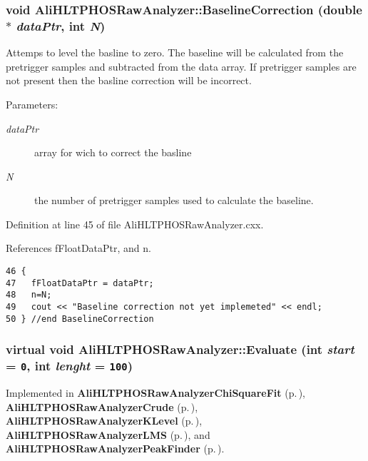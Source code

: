 \subsubsection{\setlength{\rightskip}{0pt plus 5cm}void Ali\-HLTPHOSRaw\-Analyzer::Baseline\-Correction (double $\ast$ {\em data\-Ptr}, int {\em N})}\label{classAliHLTPHOSRawAnalyzer_AliHLTPHOSRawAnalyzerPeakFindera7}


Attemps to level the basline to zero. The baseline will be calculated from the pretrigger samples and subtracted from the data array. If pretrigger samples are not present then the basline correction will be incorrect. \begin{Desc}
\item[Parameters:]
\begin{description}
\item[{\em data\-Ptr}]array for wich to correct the basline \item[{\em N}]the number of pretrigger samples used to calculate the baseline. \end{description}
\end{Desc}


Definition at line 45 of file Ali\-HLTPHOSRaw\-Analyzer.cxx.

References f\-Float\-Data\-Ptr, and n.

\footnotesize\begin{verbatim}46 {
47   fFloatDataPtr = dataPtr;  
48   n=N;
49   cout << "Baseline correction not yet implemeted" << endl;
50 } //end BaselineCorrection
\end{verbatim}\normalsize 


\subsubsection{\setlength{\rightskip}{0pt plus 5cm}virtual void Ali\-HLTPHOSRaw\-Analyzer::Evaluate (int {\em start} = {\tt 0}, int {\em lenght} = {\tt 100})\hspace{0.3cm}{\tt  [pure virtual]}}\label{classAliHLTPHOSRawAnalyzer_AliHLTPHOSRawAnalyzera14}




Implemented in {\bf Ali\-HLTPHOSRaw\-Analyzer\-Chi\-Square\-Fit} {\rm (p.\,\pageref{classAliHLTPHOSRawAnalyzerChiSquareFit_AliHLTPHOSRawAnalyzerChiSquareFita4})}, {\bf Ali\-HLTPHOSRaw\-Analyzer\-Crude} {\rm (p.\,\pageref{classAliHLTPHOSRawAnalyzerCrude_AliHLTPHOSRawAnalyzerCrudea4})}, {\bf Ali\-HLTPHOSRaw\-Analyzer\-KLevel} {\rm (p.\,\pageref{classAliHLTPHOSRawAnalyzerKLevel_AliHLTPHOSRawAnalyzerKLevela4})}, {\bf Ali\-HLTPHOSRaw\-Analyzer\-LMS} {\rm (p.\,\pageref{classAliHLTPHOSRawAnalyzerLMS_AliHLTPHOSRawAnalyzerLMSa5})}, and {\bf Ali\-HLTPHOSRaw\-Analyzer\-Peak\-Finder} {\rm (p.\,\pageref{classAliHLTPHOSRawAnalyzerPeakFinder_AliHLTPHOSRawAnalyzerPeakFindera6})}.
